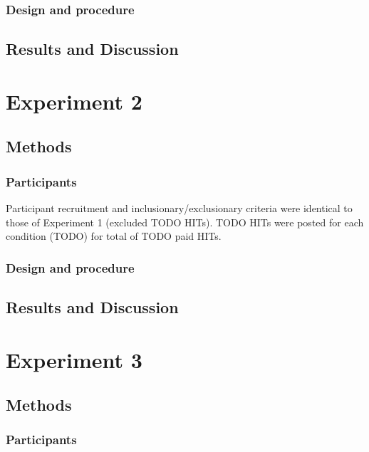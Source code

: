 \documentclass[10pt, letterpaper]{article}
\begin{document}
\subsubsection{Design and procedure}\label{design-and-procedure}

\subsection{Results and Discussion}\label{results-and-discussion}

\section{Experiment 2}\label{experiment-2}

\subsection{Methods}\label{methods-1}

\subsubsection{Participants}\label{participants-1}

Participant recruitment and inclusionary/exclusionary criteria were
identical to those of Experiment 1 (excluded TODO HITs). TODO HITs were
posted for each condition (TODO) for total of TODO paid HITs.

\subsubsection{Design and procedure}\label{design-and-procedure-1}

\subsection{Results and Discussion}\label{results-and-discussion-1}

\section{Experiment 3}\label{experiment-3}

\subsection{Methods}\label{methods-2}

\subsubsection{Participants}\label{participants-2}
\end{document}
